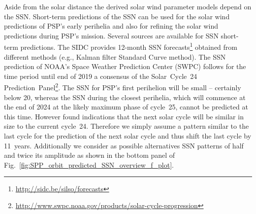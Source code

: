 Aside from the solar distance the derived solar wind parameter models depend on the SSN. Short-term predictions of the SSN can be used for the solar wind predictions of PSP's early perihelia and also for refining the solar wind predictions during PSP's mission. Several sources are available for SSN short-term predictions. The SIDC provides 12-month SSN forecasts\footnote{\url{http://sidc.be/silso/forecasts}} obtained from different methods (e.g., Kalman filter Standard Curve method). The SSN prediction of NOAA's Space Weather Prediction Center (SWPC) follows for the time period until end of 2019 a consensus of the Solar~Cycle~24 Prediction~Panel\footnote{\url{http://www.swpc.noaa.gov/products/solar-cycle-progression}}.
The SSN for PSP's first perihelion will be small -- certainly below 20, whereas the SSN during the closest perihelia, which will commence at the end of 2024 at the likely maximum phase of cycle~25, cannot be predicted at this time. However \citet{Hathaway2016} found indications that the next solar cycle will be similar in size to the current cycle~24. Therefore we simply assume a pattern similar to the last cycle for the prediction of the next solar cycle and thus shift the last cycle by 11~years. Additionally we consider as possible alternatives SSN patterns of half and twice its amplitude as shown in the bottom panel of Fig.~\ref{fig:SPP_orbit_predicted_SSN_overview_f_plot}.

